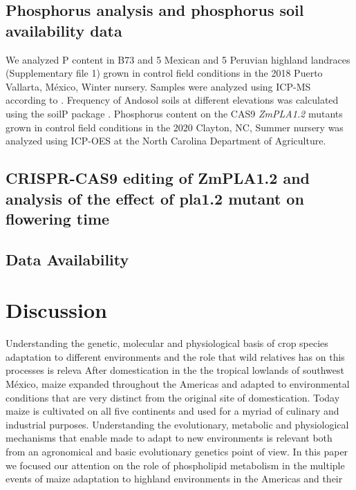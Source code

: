 \documentclass[9pt,twocolumn,twoside]{BioRxiv}
\begin{document}
\subsection{Phosphorus analysis and phosphorus soil availability data}
We analyzed P content in B73 and 5 Mexican  and 5 Peruvian highland landraces (Supplementary file 1) grown in control field conditions in the 2018 Puerto Vallarta, México, Winter nursery. Samples were analyzed using ICP-MS according to \cite{Baxter2014-ch}. 
Frequency of Andosol soils at different elevations was calculated using the soilP package \cite{Rodriguez-Zapata2018-vz}.
Phosphorus content on the CAS9 \textit{ZmPLA1.2} mutants grown in control field conditions in the 2020 Clayton, NC, Summer nursery was analyzed using ICP-OES at the North Carolina Department of Agriculture.   

\subsection{CRISPR-CAS9 editing of ZmPLA1.2 and analysis of the effect of pla1.2 mutant on flowering time}

\subsection{Data Availability}

\section{Discussion}
\label{sec:discussion}
Understanding the genetic, molecular and  physiological basis of crop species adaptation to different environments and the role that wild relatives has on this processes is releva
After domestication in the the tropical lowlands of southwest México, maize expanded throughout the Americas and adapted to environmental conditions that are very distinct from the original site of domestication.
Today maize is  cultivated on all five continents and used for a myriad of culinary and industrial purposes. 
Understanding the evolutionary, metabolic and physiological mechanisms that enable made to adapt to new environments is relevant both from an agronomical and basic evolutionary genetics point of view.
In this paper we focused our attention on the role of phospholipid metabolism in the multiple events of maize adaptation to highland environments in the Americas and their
\end{document}
